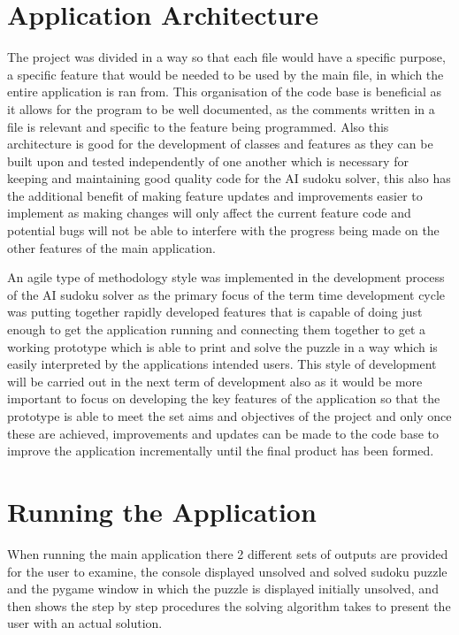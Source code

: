 \documentclass[]{final_report}
\begin{document}
\section{Application Architecture}

The project was divided in a way so that each file would have a specific purpose, a specific feature that would be needed to be used by the main file, in which the entire application is ran from. This organisation of the code base is beneficial as it allows for the program to be well documented, as the comments written in a file is relevant and specific to the feature being programmed. Also this architecture is good for the development of classes and features as they can be built upon and tested independently of one another which is necessary for keeping and maintaining good quality code for the AI sudoku solver, this also has the additional benefit of making feature updates and improvements easier to implement as making changes will only affect the current feature code and potential bugs will not be able to interfere with the progress being made on the other features of the main application. 

An agile type of methodology style was implemented in the development process of the AI sudoku solver as the primary focus of the term time development cycle was putting together rapidly developed features that is capable of doing just enough to get the application running and connecting them together to get a working prototype which is able to print and solve the puzzle in a way which is easily interpreted by the applications intended users. This style of development will be carried out in the next term of development also as it would be more important to focus on developing the key features of the application so that the prototype is able to meet the set aims and objectives of the project and only once these are achieved, improvements and updates can be made to the code base to improve the application incrementally until the final product has been formed. 

\section{Running the Application}

When running the main application there 2 different sets of outputs are provided for the user to examine, the console displayed unsolved and solved sudoku puzzle and the pygame window in which the puzzle is displayed initially unsolved, and then shows the step by step procedures the solving algorithm takes to present the user with an actual solution. 
\end{document}
